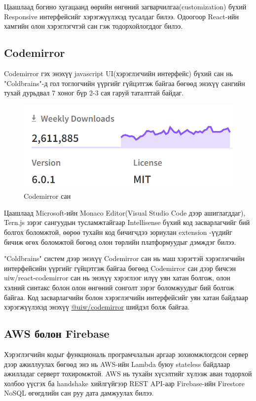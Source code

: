 Цаашлаад богино хугацаанд өөрийн өнгөний загварчилгаа(customization) бүхий Responsive интерфейсийг хэрэгжүүлэхэд тусалдаг билээ. Одоогоор React-ийн хамгийн олон хэрэглэгчтэй сан гэж тодорхойлогддог билээ. 

\subsection{Codemirror}
Codemirror гэх энэхүү javascript UI(хэрэглэгчийн интерфейс) бүхий сан нь "Coldbrains"-д гол тоглогчийн үүргийг гүйцэтгэж байгаа бөгөөд энэхүү сангийн тухай дурьдвал
7 хоног бүр 2-3 сая гаруй таталттай байдаг.   

\begin{figure}[h]
  \centering
  \includegraphics{img/codemirror-npm.PNG}
  \caption{Codemirror сан}
\end{figure}

Цаашлаад Microsoft-ийн Monaco Editor(Visual Studio Code дээр ашиглагддаг), Tern.js зэрэг сангуудын тусламжтайгаар Intellisense бүхий код засварлагчийг бий болгох боломжтой,  өөрөө тухайн код бичигчдээ зориулан extension\footnotemark{} -үүдийг бичиж өгөх боломжтой бөгөөд олон төрлийн платформуудыг дэмждэг билээ. 

"Coldbrains" систем дээр энэхүү Codemirror сан нь маш хэрэгтэй хэрэглэгчийн интерфейсийн үүргийг гүйцэтгэж байгаа бөгөөд Codemirror сан дээр бичсэн uiw/react-codemirror сан нь энэхүү хэрэглээг илүү уян хатан болгож, олон хэлний синтакс болон олон өнгөний сонголт зэрэг боломжуудыг бий болгож байгаа. Код засварлагчийн болон хэрэглэгчийн интерфейсийг уян хатан байдлаар хэрэгжүүлэхэд энэхүү \hyperlink{https://uiwjs.github.io/react-codemirror/}{@uiw/codemirror} шийдэл болж байгаа.

\subsection{AWS болон Firebase}
Хэрэглэгчийн кодыг функциональ програмчлалын аргаар зохиомжлогдсон сервер дээр ажиллуулах бөгөөд энэ нь AWS-ийн Lambda буюу stateless байдлаар ажилладаг серверт тохиромжтой. AWS нь тухайн хүсэлтийг хүлээж аван тодорхой холбоо үүсгэх ба handshake хийлгүйгээр REST API-аар Firebase-ийн Firestore NoSQL өгөгдлийн сан руу дата дамжуулах билээ. 

